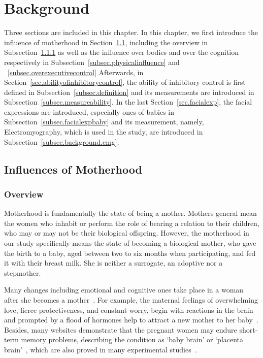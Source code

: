 \chapter{Background}\label{chp.background}

Three sections are included in this chapter.
In this chapter, we first introduce the influence of motherhood in Section~\ref{sec.influenceofmother}, including the overview in Subsection~\ref{subsec.overview} as well as the influence over bodies and over the cognition respectively in Subsection~\ref{subsec.physicalinfluence} and ~\ref{subsec.overexecutivecontrol}
Afterwards, in Section~\ref{sec.abilityofinhibitorycontrol}, the ability of inhibitory control is first defined in Subsection~\ref{subsec.definition} and its measurements are introduced in Subsection~\ref{subsec.measureability}. In the last Section~\ref{sec.facialexp}, the facial expressions are introduced, especially ones of babies in Subsection~\ref{subsec.facialexpbaby} and its measurement, namely, Electromyography, which is used in the study, are introduced in Subsection~\ref{subsec.background.emg}.

\section{Influences of Motherhood}\label{sec.influenceofmother}
\subsection{Overview}\label{subsec.overview}
Motherhood is fundamentally the state of being a mother. Mothers general mean the women who inhabit or perform the role of bearing a relation to their children, who may or may not be their biological offspring. However, the motherhood in our study specifically means the state of becoming a biological mother, who gave the birth to a baby, aged between two to six months when participating, and fed it with their breast milk. She is neither a surrogate, an adoptive nor a stepmother. 

Many changes including emotional and cognitive ones take place in a woman after she becomes a mother~\citep{jarrahi1969emotional}. For example, the maternal feelings of overwhelming love, fierce protectiveness, and constant worry, begin with reactions in the brain and prompted by a flood of hormones help to attract a new mother to her baby~\citep{Whathappenstoawomansbrain}. Besides, many websites demonstrate that the pregnant women may endure short-term memory problems, describing the condition as `baby brain' or `placenta brain'~\citep{Crystal,BabyCenter}, which are also proved in many experimental studies~\citep{henry2007review}.
			
